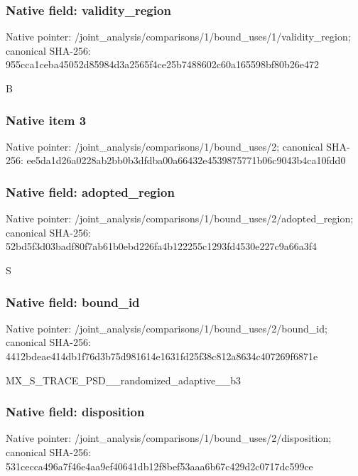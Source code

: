 \documentclass[10pt,a4paper]{article}
\begin{document}
\subsubsection{Native field: validity\_\allowbreak{}region}
Native pointer: /joint\_\allowbreak{}analysis/comparisons/1/bound\_\allowbreak{}uses/1/validity\_\allowbreak{}region; canonical SHA-256: 955cca1ceba45052d85984d3a2565f4ce25b7488602c60a165598bf80b26e472

\begingroup\raggedright\sloppy B\par\endgroup

\subsubsection{Native item 3}
Native pointer: /joint\_\allowbreak{}analysis/comparisons/1/bound\_\allowbreak{}uses/2; canonical SHA-256: ee5da1d26a0228ab2bb0b3dfdba00a66432e4539875771b06c9043b4ca10fdd0

\subsubsection{Native field: adopted\_\allowbreak{}region}
Native pointer: /joint\_\allowbreak{}analysis/comparisons/1/bound\_\allowbreak{}uses/2/adopted\_\allowbreak{}region; canonical SHA-256: 52bd5f3d03badf80f7ab61b0ebd226fa4b122255c1293fd4530e227c9a66a3f4

\begingroup\raggedright\sloppy S\par\endgroup

\subsubsection{Native field: bound\_\allowbreak{}id}
Native pointer: /joint\_\allowbreak{}analysis/comparisons/1/bound\_\allowbreak{}uses/2/bound\_\allowbreak{}id; canonical SHA-256: 4412bdeae414db1f76d3b75d981614e1631fd25f38c812a8634c407269f6871e

\begingroup\raggedright\sloppy MX\_\allowbreak{}S\_\allowbreak{}TRACE\_\allowbreak{}PSD\_\allowbreak{}\_\allowbreak{}randomized\_\allowbreak{}adaptive\_\allowbreak{}\_\allowbreak{}b3\par\endgroup

\subsubsection{Native field: disposition}
Native pointer: /joint\_\allowbreak{}analysis/comparisons/1/bound\_\allowbreak{}uses/2/disposition; canonical SHA-256: 531cecca496a7f46e4aa9ef40641db12f8bef53aaa6b67c429d2c0717dc599ce
\end{document}
